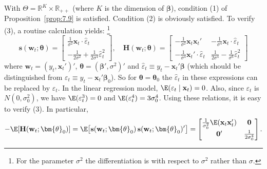 \begin{example}
With $\Theta = \mathbb{R}^K \times \mathbb{R}_{++}$ (where $K$ is the dimension of $\bm{\beta}$), condition (1) of Proposition~\ref{prop:7.9} is satisfied. Condition (2) is obviously satisfied. To verify (3), a routine calculation yields:%
\footnote{For the parameter $\sigma^2$ the differentiation is with respect to $\sigma^2$ rather than $\sigma$.}
\begin{equation}
\label{eq:7.3.17}
\mathbf{s}(\mathbf{w}_t; \bm{\theta}) = \begin{bmatrix} \frac{1}{\sigma^2} \mathbf{x}_t \cdot \hat{\varepsilon}_t \\[4pt] -\frac{1}{2\sigma^2} + \frac{1}{2\sigma^4} \hat{\varepsilon}_t^2 \end{bmatrix}, \quad \mathbf{H}(\mathbf{w}_t; \bm{\theta}) = \begin{bmatrix} -\frac{1}{\sigma^2}\mathbf{x}_t \mathbf{x}_t' & -\frac{1}{\sigma^4}\mathbf{x}_t \cdot \hat{\varepsilon}_t \\[4pt] -\frac{1}{\sigma^4}\mathbf{x}_t' \cdot \hat{\varepsilon}_t & \frac{1}{2\sigma^4} - \frac{1}{\sigma^6}\hat{\varepsilon}_t^2 \end{bmatrix}
\end{equation}
where $\mathbf{w}_t = (y_t, \mathbf{x}_t')'$, $\bm{\theta} = (\bm{\beta}', \sigma^2)'$ and $\hat{\varepsilon}_t \equiv y_t - \mathbf{x}_t'\bm{\beta}$ (which should be distinguished from $\varepsilon_t \equiv y_t - \mathbf{x}_t'\bm{\beta}_0$). So for $\bm{\theta} = \bm{\theta}_0$ the $\hat{\varepsilon}_t$ in these expressions can be replaced by $\varepsilon_t$. In the linear regression model, $\E(\varepsilon_t \mid \mathbf{x}_t) = 0$. Also, since $\varepsilon_t$ is $N(0, \sigma_0^2)$, we have $\E(\varepsilon_t^3) = 0$ and $\E(\varepsilon_t^4) = 3\sigma_0^4$. Using these relations, it is easy to verify (3). In particular,
\begin{equation}
\label{eq:7.3.18}
-\E[\mathbf{H}(\mathbf{w}_t; \bm{\theta}_0)] = \E\bigl[\mathbf{s}(\mathbf{w}_t; \bm{\theta}_0)\,\mathbf{s}(\mathbf{w}_t; \bm{\theta}_0)'\bigr] = \begin{bmatrix} \frac{1}{\sigma_0^2}\E(\mathbf{x}_t \mathbf{x}_t') & \mathbf{0} \\[4pt] \mathbf{0}' & \frac{1}{2\sigma_0^4} \end{bmatrix}.
\end{equation}


\end{example}
